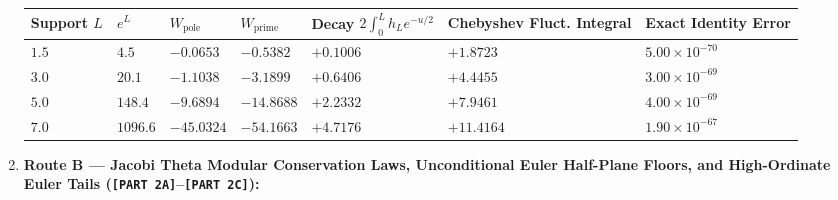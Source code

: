 \documentclass[
  11pt,
]{article}
\newcounter{none} %
\begin{document}
\begin{enumerate}
  {\def\LTcaptype{none} %
  \begin{longtable}[]{@{}
    >{\centering\arraybackslash}p{}
    >{\centering\arraybackslash}p{}
    >{\centering\arraybackslash}p{}
    >{\centering\arraybackslash}p{}
    >{\centering\arraybackslash}p{}
    >{\centering\arraybackslash}p{}
    >{\centering\arraybackslash}p{}@{}}
  \toprule\noalign{}
  \begin{minipage}[b]{\linewidth}\centering
  Support \(L\)
  \end{minipage} & \begin{minipage}[b]{\linewidth}\centering
  \(e^L\)
  \end{minipage} & \begin{minipage}[b]{\linewidth}\centering
  \(W_{\text{pole}}\)
  \end{minipage} & \begin{minipage}[b]{\linewidth}\centering
  \(W_{\text{prime}}\)
  \end{minipage} & \begin{minipage}[b]{\linewidth}\centering
  Decay \(2\int_0^L h_L e^{-u/2}\)
  \end{minipage} & \begin{minipage}[b]{\linewidth}\centering
  Chebyshev Fluct. Integral
  \end{minipage} & \begin{minipage}[b]{\linewidth}\centering
  Exact Identity Error
  \end{minipage} \\
  \midrule\noalign{}
  \endhead
  \bottomrule\noalign{}
  \endlastfoot
  \(1.5\) & \(4.5\) & \(-0.0653\) & \(-0.5382\) & \(+0.1006\) &
  \(+1.8723\) & \textbf{\(5.00 \times 10^{-70}\)} \\
  \(3.0\) & \(20.1\) & \(-1.1038\) & \(-3.1899\) & \(+0.6406\) &
  \(+4.4455\) & \textbf{\(3.00 \times 10^{-69}\)} \\
  \(5.0\) & \(148.4\) & \(-9.6894\) & \(-14.8688\) & \(+2.2332\) &
  \(+7.9461\) & \textbf{\(4.00 \times 10^{-69}\)} \\
  \textbf{\(7.0\)} & \textbf{\(1096.6\)} & \textbf{\(-45.0324\)} &
  \textbf{\(-54.1663\)} & \textbf{\(+4.7176\)} & \textbf{\(+11.4164\)} &
  \textbf{\(1.90 \times 10^{-67}\)} \\
  \end{longtable}
  }
\item
  \textbf{Route B --- Jacobi Theta Modular Conservation Laws,
  Unconditional Euler Half-Plane Floors, and High-Ordinate Euler Tails
  (\texttt{{[}PART\ 2A{]}}--\texttt{{[}PART\ 2C{]}}):}


\end{enumerate}
\end{document}
